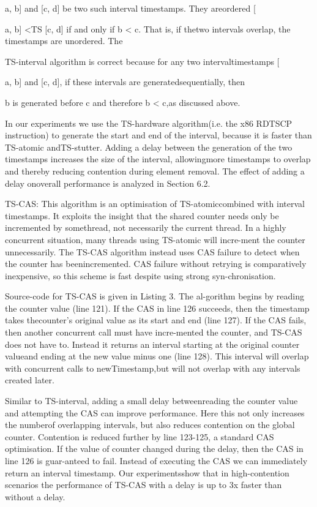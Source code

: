 a, b] and [c, d] be two such interval timestamps. They areordered [

a, b] <TS [c, d] if and only if b < c. That is, if thetwo intervals overlap, the timestamps are unordered. The

TS-interval algorithm is correct because for any two intervaltimestamps [

a, b] and [c, d], if these intervals are generatedsequentially, then

b is generated before c and therefore b < c,as discussed above.

In our experiments we use the TS-hardware algorithm(i.e. the x86 RDTSCP instruction) to generate the start and
end of the interval, because it is faster than TS-atomic andTS-stutter. Adding a delay between the generation of the
two timestamps increases the size of the interval, allowingmore timestamps to overlap and thereby reducing contention
during element removal. The effect of adding a delay onoverall performance is analyzed in Section 6.2.

TS-CAS: This algorithm is an optimisation of TS-atomiccombined with interval timestamps. It exploits the insight
that the shared counter needs only be incremented by somethread, not necessarily the current thread. In a highly concurrent situation, many threads using TS-atomic will incre-ment the counter unnecessarily. The TS-CAS algorithm instead uses CAS failure to detect when the counter has beenincremented. CAS failure without retrying is comparatively
inexpensive, so this scheme is fast despite using strong syn-chronisation.

Source-code for TS-CAS is given in Listing 3. The al-gorithm begins by reading the counter value (line 121). If
the CAS in line 126 succeeds, then the timestamp takes thecounter's original value as its start and end (line 127). If
the CAS fails, then another concurrent call must have incre-mented the counter, and TS-CAS does not have to. Instead
it returns an interval starting at the original counter valueand ending at the new value minus one (line 128). This interval will overlap with concurrent calls to newTimestamp,but will not overlap with any intervals created later.

Similar to TS-interval, adding a small delay betweenreading the counter value and attempting the CAS can improve performance. Here this not only increases the numberof overlapping intervals, but also reduces contention on the
global counter. Contention is reduced further by line 123-125, a standard CAS optimisation. If the value of counter
changed during the delay, then the CAS in line 126 is guar-anteed to fail. Instead of executing the CAS we can immediately return an interval timestamp. Our experimentsshow that in high-contention scenarios the performance of
TS-CAS with a delay is up to 3x faster than without a delay.

